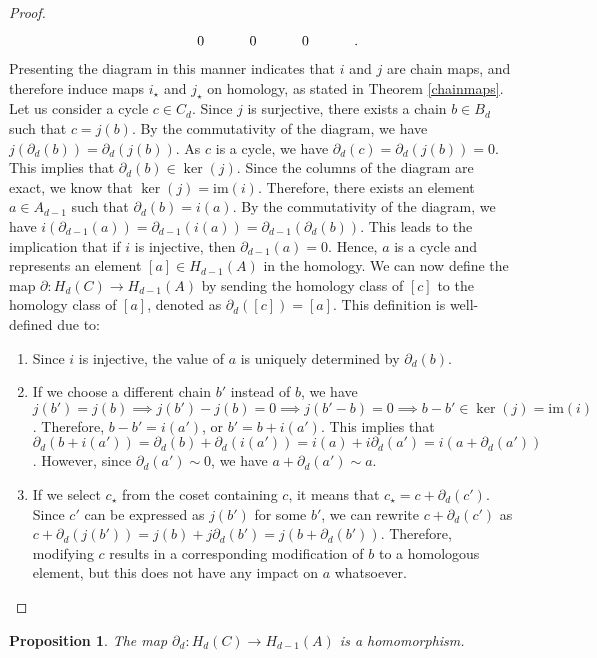 \documentclass{amsart}
\newtheorem{proposition}[definition]{Proposition}
\begin{document}
\begin{proof}
\begin{equation}
\begin{tikzcd}
                 & 0                                                                   & 0                                                               & 0                                                                   &       .
\end{tikzcd}
\end{equation}
Presenting the diagram in this manner indicates that $i$ and $j$ are chain maps, and therefore induce maps $i_\star$ and $j_\star$ on homology, as stated in Theorem \ref{chainmaps}. Let us consider a cycle $c \in C_d$. Since $j$ is surjective, there exists a chain $b \in B_d$ such that $c = j(b)$. By the commutativity of the diagram, we have $j(\partial_d(b)) = \partial_d(j(b))$. As $c$ is a cycle, we have $\partial_d(c) = \partial_d(j(b)) = 0$. This implies that $\partial_d(b) \in \ker(j)$. Since the columns of the diagram are exact, we know that $\ker(j) = \text{im}(i)$. Therefore, there exists an element $a \in A_{d-1}$ such that $\partial_{d}(b) = i(a)$. By the commutativity of the diagram, we have $i(\partial_{d-1}(a)) = \partial_{d-1}(i(a)) = \partial_{d-1}(\partial_{d}(b))$. This leads to the implication that if $i$ is injective, then $\partial_{d-1}(a) = 0$. Hence, $a$ is a cycle and represents an element $[a] \in H_{d-1}(A)$ in the homology. We can now define the map $\partial: H_d(C) \rightarrow H_{d-1}(A)$ by sending the homology class of $[c]$ to the homology class of $[a]$, denoted as $\partial_d([c]) = [a]$. This definition is well-defined due to:
\begin{enumerate}
	\item Since $i$ is injective, the value of $a$ is uniquely determined by $\partial_{d}(b)$.
	\item If we choose a different chain $b'$ instead of $b$, we have $j(b') = j(b) \implies j(b')-j(b) = 0 \implies j(b'-b) = 0 \implies b-b' \in \ker(j) = \text{im}(i)$. Therefore, $b-b' = i(a')$, or $b' = b+i(a')$. This implies that $\partial_d(b+i(a')) = \partial_d(b) + \partial_d(i(a')) = i(a) + i \partial_d(a') = i(a + \partial_d(a'))$. However, since $\partial_d(a') \sim 0$, we have $a+\partial_d(a') \sim a$.
	\item If we select $c_\star$ from the coset containing $c$, it means that $c_\star = c + \partial_d(c')$. Since $c'$ can be expressed as $j(b')$ for some $b'$, we can rewrite $c+\partial_d(c')$ as $c+\partial_d(j(b')) = j(b) + j\partial_d(b') = j(b+\partial_d(b'))$. Therefore, modifying $c$ results in a corresponding modification of $b$ to a homologous element, but this does not have any impact on $a$ whatsoever.
\end{enumerate}
\end{proof}
\begin{proposition}
The map $\partial_d: H_d(C) \rightarrow H_{d-1}(A)$ is a homomorphism.
\end{proposition}
\end{document}
